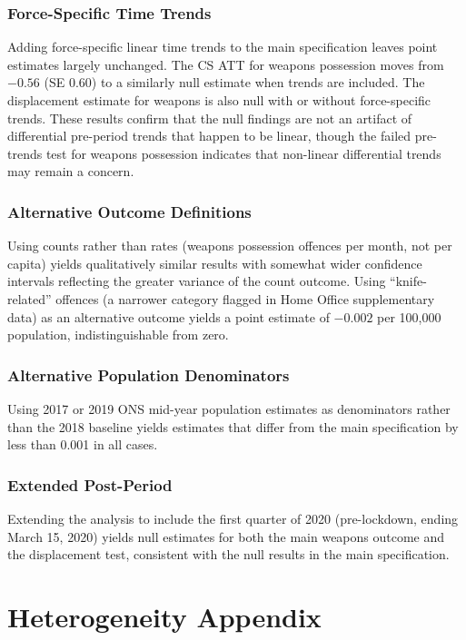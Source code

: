 \documentclass[12pt]{article}
\begin{document}
\subsubsection*{Force-Specific Time Trends}

Adding force-specific linear time trends to the main specification leaves point estimates largely unchanged. The CS ATT for weapons possession moves from $-0.56$ (SE 0.60) to a similarly null estimate when trends are included. The displacement estimate for weapons is also null with or without force-specific trends. These results confirm that the null findings are not an artifact of differential pre-period trends that happen to be linear, though the failed pre-trends test for weapons possession indicates that non-linear differential trends may remain a concern.

\subsubsection*{Alternative Outcome Definitions}

Using counts rather than rates (weapons possession offences per month, not per capita) yields qualitatively similar results with somewhat wider confidence intervals reflecting the greater variance of the count outcome. Using ``knife-related'' offences (a narrower category flagged in Home Office supplementary data) as an alternative outcome yields a point estimate of $-0.002$ per 100,000 population, indistinguishable from zero.

\subsubsection*{Alternative Population Denominators}

Using 2017 or 2019 ONS mid-year population estimates as denominators rather than the 2018 baseline yields estimates that differ from the main specification by less than 0.001 in all cases.

\subsubsection*{Extended Post-Period}

Extending the analysis to include the first quarter of 2020 (pre-lockdown, ending March 15, 2020) yields null estimates for both the main weapons outcome and the displacement test, consistent with the null results in the main specification.


\section{Heterogeneity Appendix}
\label{sec:heterogeneity_appendix}
\end{document}
